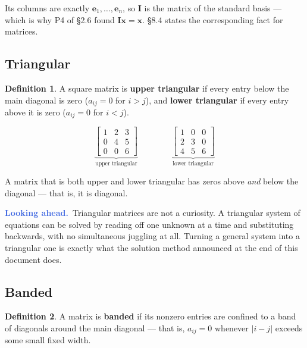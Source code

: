 \documentclass[11pt]{article}
\theoremstyle{plain}
\theoremstyle{definition}
\newtheorem{defn}{Definition}[section]
\theoremstyle{remark}
\newcommand{\lookahead}{\par\smallskip\noindent
  \textbf{\sffamily\textcolor{RoyalBlue}{Looking ahead.}}\ \ignorespaces}
\newcommand{\vc}[1]{\mathbf{#1}}        %
\newcommand{\mt}[1]{\mathbf{#1}}        %
\begin{document}
\noindent Its columns are exactly $\vc{e}_1,\dots,\vc{e}_n$, so $\mt{I}$ is the
matrix of the standard basis --- which is why P4 of \S2.6 found
$\mt{I}\vc{x}=\vc{x}$. \S8.4 states the corresponding fact for matrices.

\subsection{Triangular}
\begin{defn}
A square matrix is \textbf{upper triangular} if every entry below the main
diagonal is zero ($a_{ij}=0$ for $i>j$), and \textbf{lower triangular} if every
entry above it is zero ($a_{ij}=0$ for $i<j$).
\end{defn}

\[
  \underbrace{\begin{bmatrix}1&2&3\\0&4&5\\0&0&6\end{bmatrix}}_{\text{upper triangular}}
  \qquad\qquad
  \underbrace{\begin{bmatrix}1&0&0\\2&3&0\\4&5&6\end{bmatrix}}_{\text{lower triangular}}
\]

\noindent A matrix that is both upper and lower triangular has zeros above
\emph{and} below the diagonal --- that is, it is diagonal.

\lookahead Triangular matrices are not a curiosity. A triangular system of
equations can be solved by reading off one unknown at a time and substituting
backwards, with no simultaneous juggling at all. Turning a general system into a
triangular one is exactly what the solution method announced at the end of this
document does.

\subsection{Banded}
\begin{defn}
A matrix is \textbf{banded} if its nonzero entries are confined to a band of
diagonals around the main diagonal --- that is, $a_{ij}=0$ whenever $|i-j|$
exceeds some small fixed width.
\end{defn}
\end{document}
